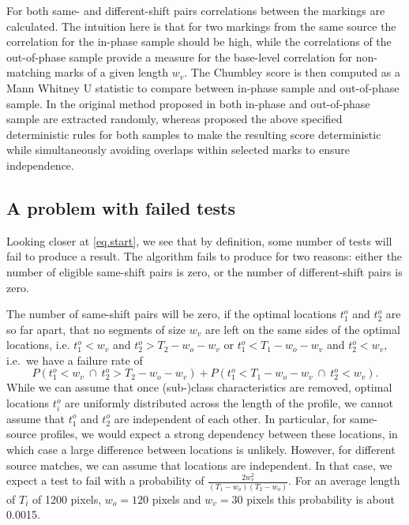 \documentclass[12pt]{article}
\begin{document}
For both same- and different-shift pairs correlations between the
markings are calculated. The intuition here is that for two markings
from the same source the correlation for the in-phase sample should be
high, while the correlations of the out-of-phase sample provide a
measure for the base-level correlation for non-matching marks of a given
length \(w_v\). The Chumbley score is then computed as a Mann Whitney U
statistic to compare between in-phase sample and out-of-phase sample. In
the original method proposed in \citet{chumbley} both in-phase and
out-of-phase sample are extracted randomly, whereas \citet{hadler}
proposed the above specified deterministic rules for both samples to
make the resulting score deterministic while simultaneously avoiding
overlaps within selected marks to ensure independence.

\subsection{A problem with failed
tests}\label{a-problem-with-failed-tests}

Looking closer at \autoref{eq.start}, we see that by definition, some
number of tests will fail to produce a result.
The algorithm fails to produce for two reasons: either the number of
eligible same-shift pairs is zero, or the number of different-shift
pairs is zero.

The number of same-shift pairs will be zero, if the optimal locations
\(t_1^{o}\) and \(t_2^{o}\) are so far apart, that no segments of size
\(w_v\) are left on the same sides of the optimal locations, i.e.
\(t_1^{o} < w_v\) and \(t_2^{o} > T_2-w_o-w_v\) or
\(t_1^{o} < T_1- w_o - w_v\) and \(t_2^{o} < w_v\), i.e.~we have a
failure rate of \[
P\left( t_1^{o} < w_v \ \cap \ t_2^{o} > T_2-w_o-w_v\right) + P\left( t_1^{o} < T_1- w_o - w_v \ \cap \ t_2^{o} < w_v\right).
\] While we can assume that once (sub-)class characteristics are
removed, optimal locations \(t_i^{o}\) are uniformly distributed across
the length of the profile, we cannot assume that \(t_1^o\) and \(t_2^o\)
are independent of each other. In particular, for same-source profiles,
we would expect a strong dependency between these locations, in which
case a large difference between locations is unlikely. However, for
different source matches, we can assume that locations are independent.
In that case, we expect a test to fail with a probability of
\(\frac{2 w_v^2}{(T_1-w_o)(T_2-w_o)}\). For an average length of \(T_i\)
of 1200 pixels, \(w_o = 120\) pixels and \(w_v = 30\) pixels this
probability is about 0.0015.
\end{document}
